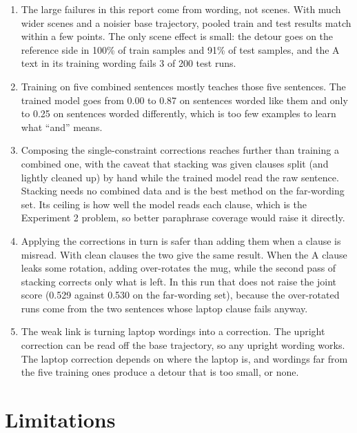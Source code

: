 \documentclass[11pt]{article}
\begin{document}
\begin{enumerate}
  \item The large failures in this report come from wording, not scenes. With much wider scenes and a
        noisier base trajectory, pooled train and test results match within a few points. The only scene
        effect is small: the detour goes on the reference side in 100\% of train samples and 91\% of test
        samples, and the A text in its training wording fails 3 of 200 test runs.
  \item Training on five combined sentences mostly teaches those five sentences. The trained model goes
        from 0.00 to 0.87 on sentences worded like them and only to 0.25 on sentences worded
        differently, which is too few examples to learn what ``and'' means.
  \item Composing the single-constraint corrections reaches further than training a combined one, with the
        caveat that stacking was given clauses split (and lightly cleaned up) by hand while the trained
        model read the raw sentence. Stacking needs no combined data and is the best method on the
        far-wording set. Its ceiling is how
        well the model reads each clause, which is the Experiment 2 problem, so better paraphrase coverage
        would raise it directly.
  \item Applying the corrections in turn is safer than adding them when a clause is misread. With clean
        clauses the two give the same result. When the A clause leaks some rotation, adding over-rotates
        the mug, while the second pass of stacking corrects only what is left. In this run that does not
        raise the joint score (0.529 against 0.530 on the far-wording set), because the over-rotated runs
        come from the two sentences whose laptop clause fails anyway.
  \item The weak link is turning laptop wordings into a correction. The upright correction can be read
        off the base trajectory, so any upright wording works. The laptop correction depends on where the
        laptop is, and wordings far from the five training ones produce a detour that is too small, or
        none.
\end{enumerate}

\section{Limitations}
\end{document}
